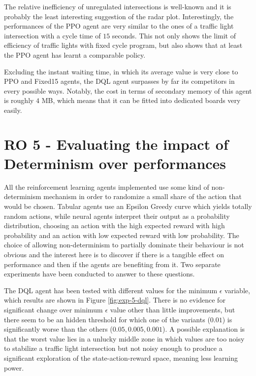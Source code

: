 The relative inefficiency of unregulated intersections is well-known and it is probably the least interesting suggestion of the radar plot.
Interestingly, the performances of the PPO agent are very similar to the ones of a traffic light intersection with a cycle time of $15$ seconds.
This not only shows the limit of efficiency of traffic lights with fixed cycle program, but also shows that at least the PPO agent has learnt a comparable policy.

Excluding the instant waiting time, in which its average value is very close to PPO and Fixed15 agents, the DQL agent surpasses by far its competitors in every possible ways.
Notably, the cost in terms of secondary memory of this agent is roughly $4$ MB, which means that it can be fitted into dedicated boards very easily.


\section{RO 5 - Evaluating the impact of Determinism over performances}

All the reinforcement learning agents implemented use some kind of non-determinism mechanism in order to randomize a small share of the action that would be chosen. Tabular agents use an Epsilon Greedy curve which yields totally random actions, while neural agents interpret their output as a probability distribution, choosing an action with the high expected reward with high probability and an action with low expected reward with low probability. The choice of allowing non-determinism to partially dominate their behaviour is not obvious and the interest here is to discover if there is a tangible effect on performance and then if the agents are benefiting from it. Two separate experiments have been conducted to answer to these questions.

The DQL agent has been tested with different values for the minimum $\epsilon$ variable, which results are shown in Figure \ref{fig:exp-5-dql}. There is no evidence for significant change over minimum $\epsilon$ value other than little improvements, but there seem to be an hidden threshold for which one of the variants ($0.01$) is significantly worse than the others ($0.05, 0.005, 0.001$). A possible explanation is that the worst value lies in a unlucky middle zone in which values are too noisy to stabilize a traffic light intersection but not noisy enough to produce a significant exploration of the state-action-reward space, meaning less learning power.

